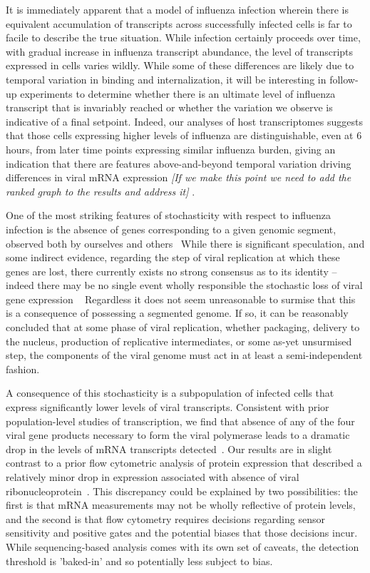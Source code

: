 \documentclass[9pt,lineno]{elife}
\newcommand{\jdbcomment}[1]{\emph{\color{red} [#1]}}
\begin{document}
It is immediately apparent that a model of influenza infection wherein there is equivalent accumulation of transcripts across successfully infected cells is far to facile to describe the true situation.
While infection certainly proceeds over time, with gradual increase in influenza transcript abundance, the level of transcripts expressed in cells varies wildly.
While some of these differences are likely due to temporal variation in binding and internalization, it will be interesting in follow-up experiments to determine whether there is an ultimate level of influenza transcript that is invariably reached or whether the variation we observe is indicative of a final setpoint.
Indeed, our analyses of host transcriptomes suggests that those cells expressing higher levels of influenza are distinguishable, even at 6 hours, from later time points expressing similar influenza burden, giving an indication that there are features above-and-beyond temporal variation driving differences in viral mRNA expression\jdbcomment{If we make this point we need to add the ranked graph to the results and address it} .

One of the most striking features of stochasticity with respect to influenza infection is the absence of genes corresponding to a given genomic segment, observed both by ourselves and others~\citep{Brooke:2013kb,Dou:2017cp}
While there is significant speculation, and some indirect evidence, regarding the step of viral replication at which these genes are lost, there currently exists no strong consensus as to its identity -- indeed there may be no single event wholly responsible the stochastic loss of viral gene expression ~\citep{Brooke:2017gm, Heldt:2015iz}
Regardless it does not seem unreasonable to surmise that this is a consequence of possessing a segmented genome. If so, it can be reasonably concluded that at some phase of viral replication, whether packaging, delivery to the nucleus, production of replicative intermediates, or some as-yet unsurmised step, the components of the viral genome must act in at least a semi-independent fashion. 

A consequence of this stochasticity is a subpopulation of infected cells that express significantly lower levels of viral transcripts. 
Consistent with prior population-level studies of transcription, we find that absence of any of the four viral gene products necessary to form the viral polymerase leads to a dramatic drop in the levels of mRNA transcripts detected~\citep{Vreede:2004ip,eisfeld2015centre}. 
Our results are in slight contrast to a prior flow cytometric analysis of protein expression that described a relatively minor drop in expression associated with absence of viral ribonucleoprotein~\citep{Brooke:2013kb}.
This discrepancy could be explained by two possibilities: the first is that mRNA measurements may not be wholly reflective of protein levels, and the second is that flow cytometry requires decisions regarding sensor sensitivity and positive gates and the potential biases that those decisions incur.
While sequencing-based analysis comes with its own set of caveats, the detection threshold is 'baked-in' and so potentially less subject to bias.
\end{document}
